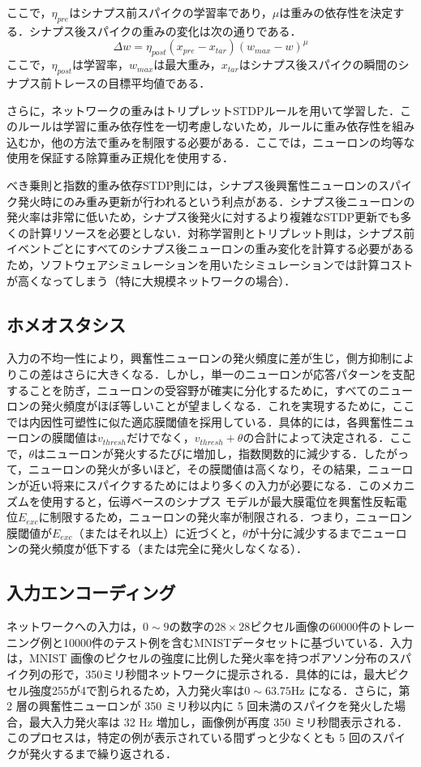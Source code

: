 \documentclass[a4paper, titlepage]{jsarticle}
\begin{document}
ここで，$\eta_{pre}$はシナプス前スパイクの学習率であり，$\mu$は重みの依存性を決定する．シナプス後スパイクの重みの変化は次の通りである．
\begin{equation}
   \Delta w=\eta_{post}(x_{pre}-x_{tar})(w_{max}-w)^\mu
\end{equation}
ここで，$\eta_{post}$は学習率，$w_{max}$は最大重み，$x_{tar}$はシナプス後スパイクの瞬間のシナプス前トレースの目標平均値である．
\par
さらに，ネットワークの重みはトリプレットSTDPルールを用いて学習した．このルールは学習に重み依存性を一切考慮しないため，ルールに重み依存性を組み込むか，他の方法で重みを制限する必要がある．ここでは，ニューロンの均等な使用を保証する除算重み正規化を使用する．
\par
べき乗則と指数的重み依存STDP則には，シナプス後興奮性ニューロンのスパイク発火時にのみ重み更新が行われるという利点がある．シナプス後ニューロンの発火率は非常に低いため，シナプス後発火に対するより複雑なSTDP更新でも多くの計算リソースを必要としない．対称学習則とトリプレット則は，シナプス前イベントごとにすべてのシナプス後ニューロンの重み変化を計算する必要があるため，ソフトウェアシミュレーションを用いたシミュレーションでは計算コストが高くなってしまう（特に大規模ネットワークの場合）．
\par
\subsection{ホメオスタシス}
入力の不均一性により，興奮性ニューロンの発火頻度に差が生じ，側方抑制によりこの差はさらに大きくなる．しかし，単一のニューロンが応答パターンを支配することを防ぎ，ニューロンの受容野が確実に分化するために，すべてのニューロンの発火頻度がほぼ等しいことが望ましくなる．これを実現するために，ここでは内因性可塑性に似た適応膜閾値を採用している．具体的には，各興奮性ニューロンの膜閾値は$v_{thresh}$だけでなく，$v_{thresh}+\theta$の合計によって決定される．ここで，$\theta$はニューロンが発火するたびに増加し，指数関数的に減少する．したがって，ニューロンの発火が多いほど，その膜閾値は高くなり，その結果，ニューロンが近い将来にスパイクするためにはより多くの入力が必要になる．このメカニズムを使用すると，伝導ベースのシナプス モデルが最大膜電位を興奮性反転電位$E_{exc}$に制限するため，ニューロンの発火率が制限される．つまり，ニューロン膜閾値が$E_{exc}$（またはそれ以上）に近づくと，$\theta$が十分に減少するまでニューロンの発火頻度が低下する（または完全に発火しなくなる）．
\subsection{入力エンコーディング}
ネットワークへの入力は，$0\sim9$の数字の$28\times28$ピクセル画像の60000件のトレーニング例と10000件のテスト例を含むMNISTデータセットに基づいている．入力は，MNIST 画像のピクセルの強度に比例した発火率を持つポアソン分布のスパイク列の形で，350ミリ秒間ネットワークに提示される．具体的には，最大ピクセル強度255が4で割られるため，入力発火率は$0\sim63.75$Hz になる．さらに，第 2 層の興奮性ニューロンが 350 ミリ秒以内に 5 回未満のスパイクを発火した場合，最大入力発火率は 32 Hz 増加し，画像例が再度 350 ミリ秒間表示される．このプロセスは，特定の例が表示されている間ずっと少なくとも 5 回のスパイクが発火するまで繰り返される．
\end{document}
